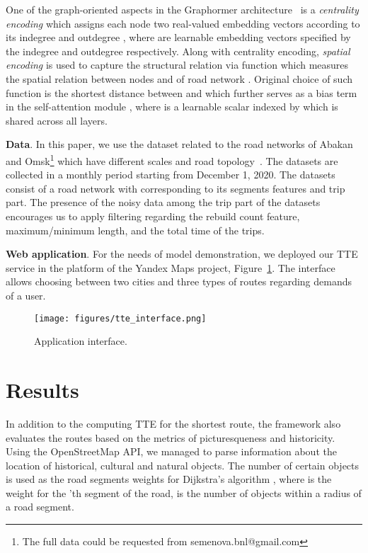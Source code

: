 \documentclass{svproc}
\begin{document}
One of the graph-oriented aspects in the Graphormer architecture~\cite{graphormer} is a \emph{centrality encoding} which assigns each node two real-valued embedding vectors according to its indegree and outdegree , where  are learnable embedding vectors specified by the indegree  and outdegree  respectively. Along with centrality encoding, \emph{spatial encoding} is used to capture the structural relation via function  which measures the spatial relation between nodes  and  of road network . Original choice of such function  is the shortest distance between  and  which further serves as a bias term in the self-attention module , where  is a learnable scalar indexed by  which is shared across all layers.

\textbf{Data}. In this paper, we use the dataset related to the road networks of Abakan and Omsk\footnote{The full data could be requested from semenova.bnl@gmail.com} which have different scales and road topology~\cite{Hybrid}. The datasets are collected in a monthly period starting from December 1, 2020. The datasets consist of a road network with corresponding to its segments features and trip part. The presence of the noisy data among the trip part of the datasets encourages us to apply filtering regarding the rebuild count feature, maximum/minimum length, and the total time of the trips. 

\textbf{Web application}. For the needs of model demonstration, we deployed our TTE service in the platform of the Yandex Maps project, Figure~\ref{interface}. The interface allows choosing between two cities and three types of routes regarding demands of a user.  


\begin{figure}[t]
\texttt{[image: figures/tte\_interface.png]}
\caption{Application interface.} 
\label{interface}
\end{figure}

\section{Results}
In addition to the computing TTE for the shortest route, the framework also evaluates the routes based on the metrics of picturesqueness and historicity. Using the OpenStreetMap API, we managed to parse information about the location of historical, cultural and natural objects. The number of certain objects is used as the road segments weights for Dijkstra's algorithm , where  is the weight for the 'th segment of the road,  is the number of objects within a radius  of a road segment.
\end{document}
